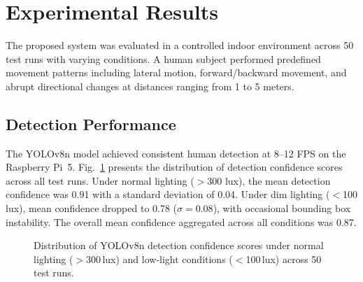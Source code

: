 \documentclass[conference]{IEEEtran}
\begin{document}
\section{Experimental Results}
\label{sec:results}

The proposed system was evaluated in a controlled indoor environment across 50 test runs with varying conditions. A human subject performed predefined movement patterns including lateral motion, forward/backward movement, and abrupt directional changes at distances ranging from 1 to 5 meters.

\subsection{Detection Performance}

The YOLOv8n model achieved consistent human detection at 8--12 FPS on the Raspberry Pi~5. Fig.~\ref{fig:detection_conf} presents the distribution of detection confidence scores across all test runs. Under normal lighting ($>$300 lux), the mean detection confidence was 0.91 with a standard deviation of 0.04. Under dim lighting ($<$100 lux), mean confidence dropped to 0.78 ($\sigma = 0.08$), with occasional bounding box instability. The overall mean confidence aggregated across all conditions was 0.87.

\begin{figure}[!t]
\centering
{}
\caption{Distribution of YOLOv8n detection confidence scores under normal lighting ($>$300\,lux) and low-light conditions ($<$100\,lux) across 50 test runs.}
\label{fig:detection_conf}
\end{figure}
\end{document}
